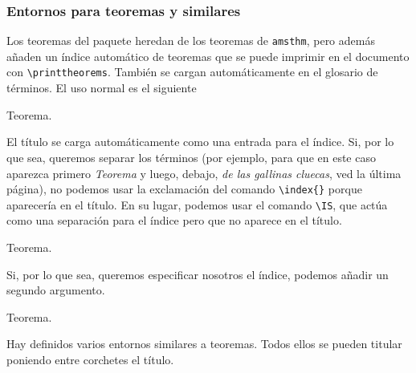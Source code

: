 \subsubsection{Entornos para teoremas y similares}

Los teoremas del paquete heredan de los teoremas de \texttt{amsthm}, pero además añaden un índice automático de teoremas que se puede imprimir en el documento con \verb|\printtheorems|. También se cargan automáticamente en el glosario de términos. El uso normal es el siguiente

\begin{LTXexample}[pos=r]
\begin{theorem}
Teorema.
\end{theorem}
\end{LTXexample}

El título se carga automáticamente como una entrada para el índice. Si, por lo que sea, queremos separar los términos (por ejemplo, para que en este caso aparezca primero \textit{Teorema} y luego, debajo, \textit{de las gallinas cluecas}, ved la última página), no podemos usar la exclamación del comando \verb|\index{}| porque aparecería en el título. En su lugar, podemos usar el comando \verb|\IS|, que actúa como una separación para el índice pero que no aparece en el título.

\begin{LTXexample}[pos=r]
\begin{theorem}
Teorema.
\end{theorem}
\end{LTXexample}

Si, por lo que sea, queremos especificar nosotros el índice, podemos añadir un segundo argumento.

\begin{LTXexample}[pos=r]
\begin{theorem}
Teorema.
\end{theorem}
\end{LTXexample}

Hay definidos varios entornos similares a teoremas. Todos ellos se pueden titular poniendo entre corchetes el título.

